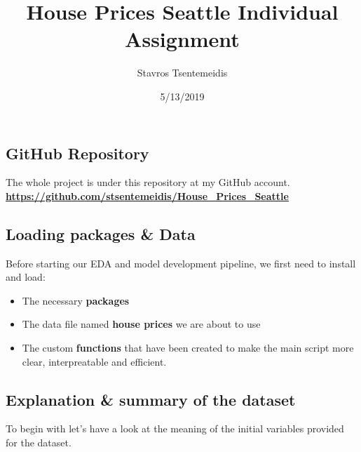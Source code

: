 \documentclass[]{article}
\title{House Prices Seattle Individual Assignment}
\author{Stavros Tsentemeidis}
\date{5/13/2019}
\providecommand{\tightlist}{%
  \setlength{\itemsep}{0pt}\setlength{\parskip}{0pt}}
\begin{document}
\maketitle

\hypertarget{github-repository}{%
\subsection{GitHub Repository}\label{github-repository}}

The whole project is under this repository at my GitHub account.\\
\textbf{\url{https://github.com/stsentemeidis/House_Prices_Seattle}}

\hypertarget{loading-packages-data}{%
\subsection{Loading packages \& Data}\label{loading-packages-data}}

Before starting our EDA and model development pipeline, we first need to
install and load:

\begin{itemize}
\tightlist
\item
  The necessary \textbf{packages}
\item
  The data file named \textbf{house prices } we are about to use
\item
  The custom \textbf{functions} that have been created to make the main
  script more clear, interpreatable and efficient.
\end{itemize}

\hypertarget{explanation-summary-of-the-dataset}{%
\subsection{Explanation \& summary of the
dataset}\label{explanation-summary-of-the-dataset}}

To begin with let's have a look at the meaning of the initial variables
provided for the dataset.
\end{document}
